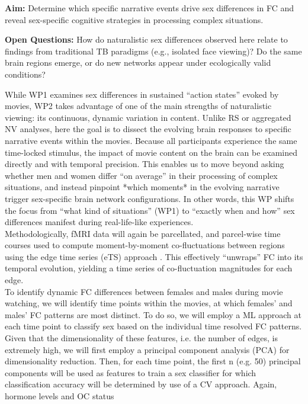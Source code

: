 \documentclass[11pt,a4paper]{article}
\begin{document}
\textbf{Aim:} Determine which specific narrative events drive sex differences in FC 
and reveal sex-specific cognitive strategies in processing complex situations.  

\textbf{Open Questions:} How do naturalistic sex differences observed here relate to findings 
from traditional TB paradigms (e.g., isolated face viewing)? Do the same brain regions emerge, 
or do new networks appear under ecologically valid conditions?  

While WP1 examines sex differences in sustained “action states” evoked by movies, 
WP2 takes advantage of one of the main strengths of naturalistic viewing: its continuous, 
dynamic variation in content. Unlike RS or aggregated NV analyses, here the goal is to dissect 
the evolving brain responses to specific narrative events within the movies. 
Because all participants experience the same time-locked stimulus, the impact of movie content on the 
brain can be examined directly and with temporal precision. This enables us to move beyond asking whether 
men and women differ “on average” in their processing of complex situations, and 
instead pinpoint *which moments* in the evolving narrative trigger sex-specific brain network configurations. 
In other words, this WP shifts the focus from “what kind of situations” (WP1) to “exactly when and how” 
sex differences manifest during real-life-like experiences.\\  
Methodologically, fMRI data will again be parcellated, and parcel-wise time courses used to compute 
moment-by-moment co-fluctuations between regions using the edge time series (eTS) approach 
\parencite{betzelLivingEdgeNetwork2023,faskowitzEdgecentricFunctionalNetwork2020a}. 
This effectively “unwraps” FC into its temporal evolution, yielding a time series of 
co-fluctuation magnitudes for each edge.\\
To identify dynamic FC differences between females and males during movie watching, we will identify
time points within the movies, at which females' and males' FC patterns are most distinct. To do so, we
will employ a ML approach at each time point to classify sex based on the individual time resolved FC
patterns. Given that the dimensionality of these features, i.e. the number of edges, is extremely high, we
will first employ a principal component analysis (PCA) for dimensionality reduction. Then, for each time
point, the first n (e.g. 50) principal components will be used as features to train a sex classifier for which
classification accuracy will be determined by use of a CV approach. Again, hormone levels and OC status
\end{document}
